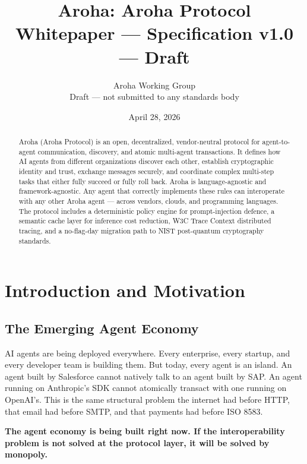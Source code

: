 \documentclass[11pt,a4paper]{article}
\title{
  \vspace{-1cm}
  \textbf{\LARGE Aroha: Aroha Protocol} \\[0.6em]
  \large Whitepaper --- Specification v1.0 --- Draft
}
\author{
  Aroha Working Group \\
  \small Draft --- not submitted to any standards body
}
\date{April 28, 2026}
\begin{document}

\maketitle
\thispagestyle{fancy}

\begin{abstract}
Aroha (Aroha Protocol) is an open, decentralized, vendor-neutral
protocol for agent-to-agent communication, discovery, and atomic multi-agent
transactions. It defines how AI agents from different organizations discover each
other, establish cryptographic identity and trust, exchange messages securely, and
coordinate complex multi-step tasks that either fully succeed or fully roll back.
Aroha is language-agnostic and framework-agnostic. Any agent that correctly implements
these rules can interoperate with any other Aroha agent --- across vendors, clouds,
and programming languages. The protocol includes a deterministic policy engine for
prompt-injection defence, a semantic cache layer for inference cost reduction,
W3C Trace Context distributed tracing, and a no-flag-day migration path to NIST
post-quantum cryptography standards.
\end{abstract}

\tableofcontents
\newpage

\section{Introduction and Motivation}

\subsection{The Emerging Agent Economy}

AI agents are being deployed everywhere. Every enterprise, every startup, and every
developer team is building them. But today, every agent is an island. An agent built
by Salesforce cannot natively talk to an agent built by SAP. An agent running on
Anthropic's SDK cannot atomically transact with one running on OpenAI's. This is
the same structural problem the internet had before HTTP, that email had before SMTP,
and that payments had before ISO 8583.

\textbf{The agent economy is being built right now. If the interoperability problem
is not solved at the protocol layer, it will be solved by monopoly.}
\end{document}
